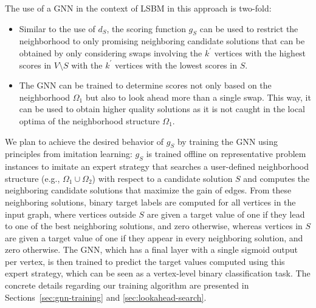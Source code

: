 \documentclass[draft,final]{vutinfth} %
\begin{document}
The use of a GNN in the context of LSBM in this approach is two-fold: 
\begin{itemize}
    \item Similar to the use of $d_S$, the scoring function $g_S$ can be used to restrict the neighborhood to only promising neighboring candidate solutions that can be obtained by only considering swaps involving the $k^\prime$ vertices with the highest scores in $V \setminus S$ with the $k^\prime$ vertices with the lowest scores in $S$. 
    \item The GNN can be trained to determine scores not only based on the neighborhood $\Omega_1$ but also to look ahead more than a single swap. This way, it can be used to obtain higher quality solutions as it is not caught in the local optima of the neighborhood structure $\Omega_1$.
\end{itemize}

We plan to achieve the desired behavior of $g_S$ by training the GNN using principles from imitation learning: 
$g_S$ is trained offline on representative problem instances to imitate an expert strategy that searches a user-defined neighborhood structure (e.g., $\Omega_1 \cup \Omega_2$) with respect to a candidate solution $S$ and computes the neighboring candidate solutions that maximize the gain of edges. From these neighboring solutions, binary target labels are computed for all vertices in the input graph, where vertices outside $S$ are given a target value of one if they lead to one of the best neighboring solutions, and zero otherwise, whereas vertices in $S$ are given a target value of one if they appear in every neighboring solution, and zero otherwise. 
The GNN, which has a final layer with a single sigmoid output per vertex, is then trained to predict the target values computed using this expert strategy, which can be seen as a vertex-level binary classification task. The concrete details regarding our training algorithm are presented in Sections~\ref{sec:gnn-training} and \ref{sec:lookahead-search}.
\end{document}
